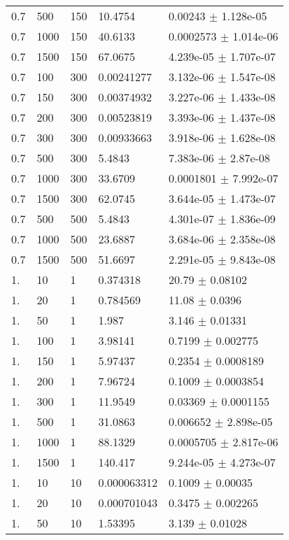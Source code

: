 \begin{longtable}{lllll}
 0.7 &   500 &   150 &  10.4754 &  0.00243 $\pm$ 1.128e-05 \\
 0.7 &  1000 &   150 &  40.6133 & 0.0002573 $\pm$ 1.014e-06 \\
 0.7 &  1500 &   150 &  67.0675 & 4.239e-05 $\pm$ 1.707e-07 \\
 0.7 &   100 &   300 & 0.00241277 & 3.132e-06 $\pm$ 1.547e-08 \\
 0.7 &   150 &   300 & 0.00374932 & 3.227e-06 $\pm$ 1.433e-08 \\
 0.7 &   200 &   300 & 0.00523819 & 3.393e-06 $\pm$ 1.437e-08 \\
 0.7 &   300 &   300 & 0.00933663 & 3.918e-06 $\pm$ 1.628e-08 \\
 0.7 &   500 &   300 &   5.4843 & 7.383e-06 $\pm$ 2.87e-08 \\
 0.7 &  1000 &   300 &  33.6709 & 0.0001801 $\pm$ 7.992e-07 \\
 0.7 &  1500 &   300 &  62.0745 & 3.644e-05 $\pm$ 1.473e-07 \\
 0.7 &   500 &   500 &   5.4843 & 4.301e-07 $\pm$ 1.836e-09 \\
 0.7 &  1000 &   500 &  23.6887 & 3.684e-06 $\pm$ 2.358e-08 \\
 0.7 &  1500 &   500 &  51.6697 & 2.291e-05 $\pm$ 9.843e-08 \\
  1. &    10 &     1 & 0.374318 &    20.79 $\pm$  0.08102 \\
  1. &    20 &     1 & 0.784569 &    11.08 $\pm$   0.0396 \\
  1. &    50 &     1 &    1.987 &    3.146 $\pm$  0.01331 \\
  1. &   100 &     1 &  3.98141 &   0.7199 $\pm$ 0.002775 \\
  1. &   150 &     1 &  5.97437 &   0.2354 $\pm$ 0.0008189 \\
  1. &   200 &     1 &  7.96724 &   0.1009 $\pm$ 0.0003854 \\
  1. &   300 &     1 &  11.9549 &  0.03369 $\pm$ 0.0001155 \\
  1. &   500 &     1 &  31.0863 & 0.006652 $\pm$ 2.898e-05 \\
  1. &  1000 &     1 &  88.1329 & 0.0005705 $\pm$ 2.817e-06 \\
  1. &  1500 &     1 &  140.417 & 9.244e-05 $\pm$ 4.273e-07 \\
  1. &    10 &    10 & 0.000063312 &   0.1009 $\pm$  0.00035 \\
  1. &    20 &    10 & 0.000701043 &   0.3475 $\pm$ 0.002265 \\
  1. &    50 &    10 &  1.53395 &    3.139 $\pm$  0.01028 \\

\end{longtable}
